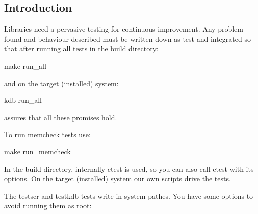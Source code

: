 \subsection*{Introduction}

Libraries need a pervasive testing for continuous improvement. Any problem found and behaviour described must be written down as test and integrated so that after running all tests in the build directory\+: \begin{DoxyVerb}make run_all
\end{DoxyVerb}


and on the target (installed) system\+: \begin{DoxyVerb}kdb run_all
\end{DoxyVerb}


assures that all these promises hold.

To run memcheck tests use\+: \begin{DoxyVerb}make run_memcheck
\end{DoxyVerb}


In the build directory, internally ctest is used, so you can also call ctest with its options. On the target (installed) system our own scripts drive the tests.

The {\ttfamily testscr} and {\ttfamily testkdb} tests write in system pathes. You have some options to avoid running them as root\+:


